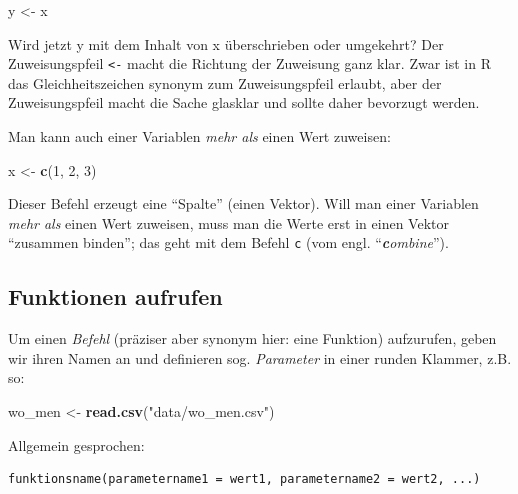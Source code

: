 \documentclass[12pt,ngerman,]{book}
\makeatletter
\newenvironment{Shaded}{\begin{snugshade}}{\end{snugshade}}
\newcommand{\KeywordTok}[1]{\textcolor[rgb]{0.13,0.29,0.53}{\textbf{#1}}}
\newcommand{\DecValTok}[1]{\textcolor[rgb]{0.00,0.00,0.81}{#1}}
\newcommand{\StringTok}[1]{\textcolor[rgb]{0.31,0.60,0.02}{#1}}
\newcommand{\NormalTok}[1]{#1}
\newenvironment{kframe}{%
\medskip{}
\setlength{\fboxsep}{.8em}
 \def\at@end@of@kframe{}%
 \ifinner\ifhmode%
  \def\at@end@of@kframe{\end{minipage}}%
  \begin{minipage}{\columnwidth}%
 \fi\fi%
 \def\FrameCommand##1{\hskip\@totalleftmargin \hskip-\fboxsep
 \colorbox{shadecolor}{##1}\hskip-\fboxsep
     \hskip-\linewidth \hskip-\@totalleftmargin \hskip\columnwidth}%
 \MakeFramed {\advance\hsize-\width
   \@totalleftmargin\z@ \linewidth\hsize
   \@setminipage}}%
 {\par\unskip\endMakeFramed%
 \at@end@of@kframe}
\renewenvironment{Shaded}{\begin{kframe}}{\end{kframe}}
\theoremstyle{definition}
\theoremstyle{definition}
\theoremstyle{remark}
\makeatother
\begin{document}
\begin{Shaded}
\begin{Highlighting}[]
\NormalTok{y <-}\StringTok{ }\NormalTok{x}
\end{Highlighting}
\end{Shaded}

Wird jetzt y mit dem Inhalt von x überschrieben oder umgekehrt? Der
Zuweisungspfeil \texttt{\textless{}-} macht die Richtung der Zuweisung
ganz klar. Zwar ist in R das Gleichheitszeichen synonym zum
Zuweisungspfeil erlaubt, aber der Zuweisungspfeil macht die Sache
glasklar und sollte daher bevorzugt werden.

Man kann auch einer Variablen \emph{mehr als} einen Wert zuweisen:

\begin{Shaded}
\begin{Highlighting}[]
\NormalTok{x <-}\StringTok{ }\KeywordTok{c}\NormalTok{(}\DecValTok{1}\NormalTok{, }\DecValTok{2}\NormalTok{, }\DecValTok{3}\NormalTok{)}
\end{Highlighting}
\end{Shaded}

Dieser Befehl erzeugt eine ``Spalte'' (einen Vektor). Will man einer
Variablen \emph{mehr als} einen Wert zuweisen, muss man die Werte erst
in einen Vektor ``zusammen binden''; das geht mit dem Befehl \texttt{c}
(vom engl. ``\emph{\textbf{c}ombine}'').

\subsection{Funktionen aufrufen}\label{funktionen-aufrufen}

Um einen \emph{Befehl} (präziser aber synonym
hier: eine Funktion) aufzurufen, geben wir ihren Namen an und definieren
sog. \emph{Parameter} in einer runden
Klammer, z.B. so:

\begin{Shaded}
\begin{Highlighting}[]
\NormalTok{wo_men <-}\StringTok{ }\KeywordTok{read.csv}\NormalTok{(}\StringTok{"data/wo_men.csv"}\NormalTok{)}
\end{Highlighting}
\end{Shaded}

Allgemein gesprochen:

\begin{verbatim}
funktionsname(parametername1 = wert1, parametername2 = wert2, ...)
\end{verbatim}
\end{document}
